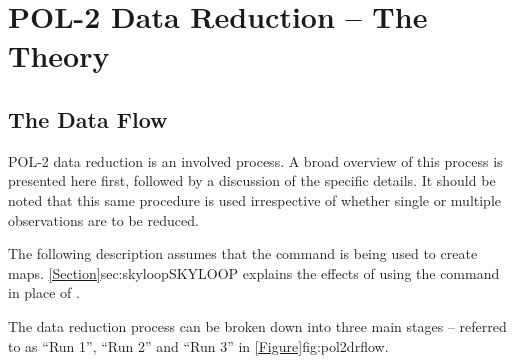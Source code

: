 \chapter{POL-2 Data Reduction -- The Theory}
\label{sec:dr}
\section{The Data Flow}

POL-2 data reduction is an involved process. A broad overview of this
process is presented here first, followed by a discussion of the specific
details. It should be noted that this same procedure is used irrespective
of whether single or multiple observations are to be reduced.

The following description assumes that the  command is
being used to create maps. \cref{Section}{sec:skyloop}{SKYLOOP} explains the effects
of using the  command in place of .

The data reduction process can be broken down into three main stages --
referred to as ``Run 1'', ``Run 2'' and ``Run 3'' in
\cref{Figure}{fig:pol2drflow}{}.

